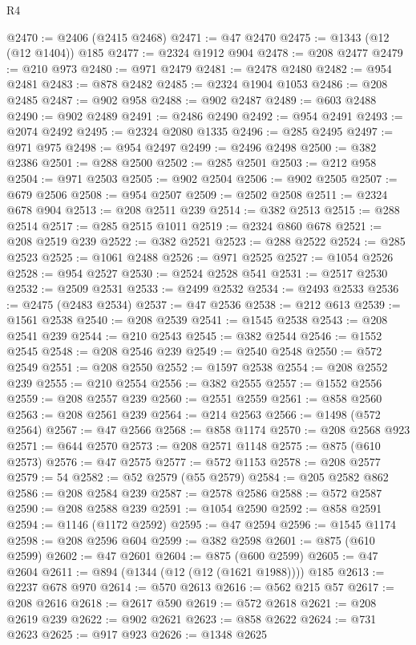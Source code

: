 \begin{lexlean}{R4}
\begin{coremodule}
@2470 := @2406 (@2415 @2468)
@2471 := @47 @2470
@2475 := @1343 (@12 (@12 @1404)) @185
@2477 := @2324 @1912 @904
@2478 := @208 @2477
@2479 := @210 @973
@2480 := @971 @2479
@2481 := @2478 @2480
@2482 := @954 @2481
@2483 := @878 @2482
@2485 := @2324 @1904 @1053
@2486 := @208 @2485
@2487 := @902 @958
@2488 := @902 @2487
@2489 := @603 @2488
@2490 := @902 @2489
@2491 := @2486 @2490
@2492 := @954 @2491
@2493 := @2074 @2492
@2495 := @2324 @2080 @1335
@2496 := @285 @2495
@2497 := @971 @975
@2498 := @954 @2497
@2499 := @2496 @2498
@2500 := @382 @2386
@2501 := @288 @2500
@2502 := @285 @2501
@2503 := @212 @958
@2504 := @971 @2503
@2505 := @902 @2504
@2506 := @902 @2505
@2507 := @679 @2506
@2508 := @954 @2507
@2509 := @2502 @2508
@2511 := @2324 @678 @904
@2513 := @208 @2511 @239
@2514 := @382 @2513
@2515 := @288 @2514
@2517 := @285 @2515 @1011
@2519 := @2324 @860 @678
@2521 := @208 @2519 @239
@2522 := @382 @2521
@2523 := @288 @2522
@2524 := @285 @2523
@2525 := @1061 @2488
@2526 := @971 @2525
@2527 := @1054 @2526
@2528 := @954 @2527
@2530 := @2524 @2528 @541
@2531 := @2517 @2530
@2532 := @2509 @2531
@2533 := @2499 @2532
@2534 := @2493 @2533
@2536 := @2475 (@2483 @2534)
@2537 := @47 @2536
@2538 := @212 @613
@2539 := @1561 @2538
@2540 := @208 @2539
@2541 := @1545 @2538
@2543 := @208 @2541 @239
@2544 := @210 @2543
@2545 := @382 @2544
@2546 := @1552 @2545
@2548 := @208 @2546 @239
@2549 := @2540 @2548
@2550 := @572 @2549
@2551 := @208 @2550
@2552 := @1597 @2538
@2554 := @208 @2552 @239
@2555 := @210 @2554
@2556 := @382 @2555
@2557 := @1552 @2556
@2559 := @208 @2557 @239
@2560 := @2551 @2559
@2561 := @858 @2560
@2563 := @208 @2561 @239
@2564 := @214 @2563
@2566 := @1498 (@572 @2564)
@2567 := @47 @2566
@2568 := @858 @1174
@2570 := @208 @2568 @923
@2571 := @644 @2570
@2573 := @208 @2571 @1148
@2575 := @875 (@610 @2573)
@2576 := @47 @2575
@2577 := @572 @1153
@2578 := @208 @2577
@2579 := 54
@2582 := @52 @2579 (@55 @2579)
@2584 := @205 @2582 @862
@2586 := @208 @2584 @239
@2587 := @2578 @2586
@2588 := @572 @2587
@2590 := @208 @2588 @239
@2591 := @1054 @2590
@2592 := @858 @2591
@2594 := @1146 (@1172 @2592)
@2595 := @47 @2594
@2596 := @1545 @1174
@2598 := @208 @2596 @604
@2599 := @382 @2598
@2601 := @875 (@610 @2599)
@2602 := @47 @2601
@2604 := @875 (@600 @2599)
@2605 := @47 @2604
@2611 := @894 (@1344 (@12 (@12 (@1621 @1988)))) @185
@2613 := @2237 @678 @970
@2614 := @570 @2613
@2616 := @562 @215 @57
@2617 := @208 @2616
@2618 := @2617 @590
@2619 := @572 @2618
@2621 := @208 @2619 @239
@2622 := @902 @2621
@2623 := @858 @2622
@2624 := @731 @2623
@2625 := @917 @923
@2626 := @1348 @2625

\end{coremodule}
\end{lexlean}
